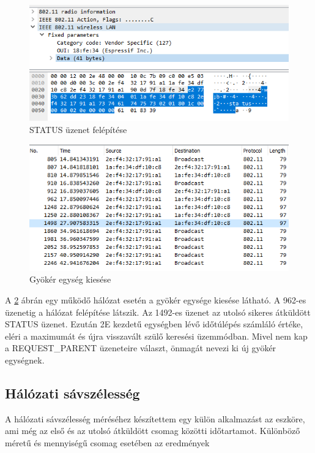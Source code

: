 \begin{figure}[th!]
    \centering
    \includegraphics[width=150mm, keepaspectratio]{figures/wireshark_status.png}
    \caption{STATUS üzenet felépítése}
    \label{fig:network_status_format}
\end{figure}

\begin{figure}[!ht]
    \centering
    \includegraphics[width=150mm, keepaspectratio]{figures/wireshark_broke.png}
    \caption{Gyökér egység kiesése}
    \label{fig:network_broke}
\end{figure}

A \ref{fig:network_broke} ábrán egy működő hálózat esetén a gyökér egysége kiesése látható. A 962-es üzenetig a hálózat felépítése látszik. Az 1492-es üzenet az utolsó sikeres átküldött STATUS üzenet. Ezután 2E kezdetű egységben lévő időtúlépés számláló értéke, eléri a maximumát és újra visszavált szülő keresési üzemmódban. Mivel nem kap a REQUEST\_PARENT üzeneteire választ, önmagát nevezi ki új gyökér egységnek.

\clearpage

\subsection{Hálózati sávszélesség}
A hálózati sávszélesség méréséhez készítettem egy külön alkalmazást az eszköre, ami még az első és az utolsó átküldött csomag közötti időtartamot. Különböző méretű és mennyiségű csomag esetében az eredmények

